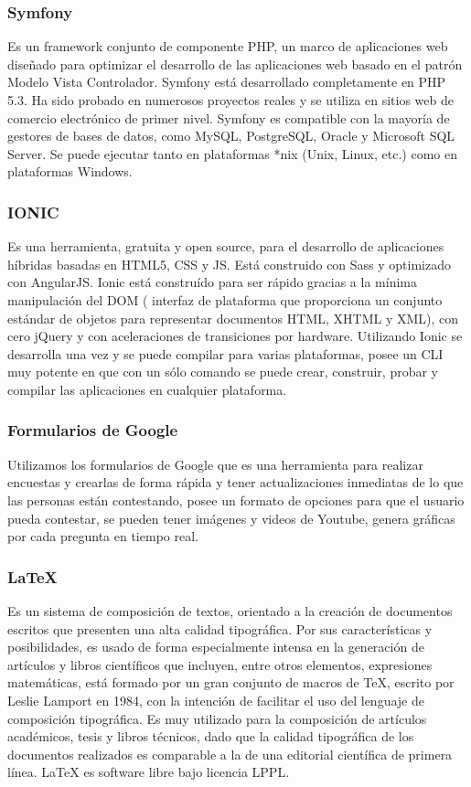 \documentclass[a4paper,openright,11pt]{article}
\begin{document}
\subsubsection{Symfony}
Es un framework conjunto de componente PHP, un marco de aplicaciones web  diseñado para optimizar el desarrollo de las aplicaciones web basado en el patrón Modelo Vista Controlador. Symfony está desarrollado completamente en PHP 5.3. Ha sido probado en numerosos proyectos reales y se utiliza en sitios web de comercio electrónico de primer nivel. Symfony es compatible con la mayoría de gestores de bases de datos, como MySQL, PostgreSQL, Oracle y Microsoft SQL Server. Se puede ejecutar tanto en plataformas *nix (Unix, Linux, etc.) como en plataformas Windows.

\subsubsection{IONIC}
Es una herramienta, gratuita y open source, para el desarrollo de aplicaciones híbridas basadas en HTML5, CSS y JS. Está construido con Sass y optimizado con AngularJS. Ionic está construído para ser rápido gracias a la mínima manipulación del DOM ( interfaz de plataforma que proporciona un conjunto estándar de objetos para representar documentos HTML, XHTML y XML), con cero jQuery y con aceleraciones de transiciones por hardware. Utilizando Ionic se desarrolla una vez y se puede compilar para varias plataformas, posee un CLI muy potente en que con un sólo comando se puede crear, construir, probar y compilar las aplicaciones en cualquier plataforma.

\subsubsection{Formularios de Google}
Utilizamos los formularios de Google que es una herramienta para realizar encuestas y crearlas de forma rápida y tener actualizaciones inmediatas de lo que las personas están contestando, posee un formato de opciones para que el usuario pueda contestar, se pueden tener imágenes y videos de Youtube, genera gráficas por cada pregunta en tiempo real.

\subsubsection{\textbf{\LaTeX}}
Es un sistema de composición de textos, orientado a la creación de documentos escritos que presenten una alta calidad tipográfica. Por sus características y posibilidades, es usado de forma especialmente intensa en la generación de artículos y libros científicos que incluyen, entre otros elementos, expresiones matemáticas, está formado por un gran conjunto de macros de TeX, escrito por Leslie Lamport en 1984, con la intención de facilitar el uso del lenguaje de composición tipográfica. Es muy utilizado para la composición de artículos académicos, tesis y libros técnicos, dado que la calidad tipográfica de los documentos realizados es comparable a la de una editorial científica de primera línea. \LaTeX \hspace{0.1cm} es software libre bajo licencia LPPL.
\end{document}
